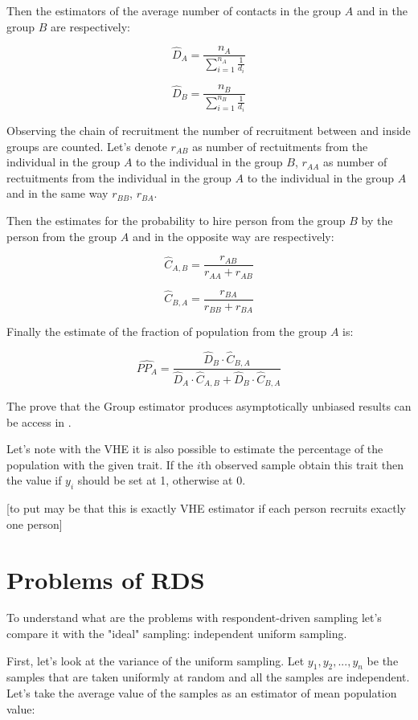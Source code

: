 \documentclass[12pt]{report}
\begin{document}
Then the estimators of the average number of contacts in the group $A$ and in the group $B$ are respectively:

$$ \widehat{D}_A = \frac{n_A}{ \sum_{i=1}^{n_A} \frac{1}{d_i}} $$

$$ \widehat{D}_B = \frac{n_B}{ \sum_{i=1}^{n_B} \frac{1}{d_i}} $$

Observing the chain of recruitment the number of recruitment between and inside groups are counted. Let's denote $r_{AB}$ as number of rectuitments from the individual in the group $A$ to the individual in the group $B$, $r_{AA}$ as number of rectuitments from the individual in the group $A$ to the individual in the group $A$ and in the same way $r_{BB}$, $r_{BA}$.

Then the estimates for the probability to hire person from the group $B$ by the person from the group $A$ and in the opposite way are respectively:


$$ \widehat{C}_{A, B} = \frac{r_{AB}}{r_{AA} + r_{AB}} $$

$$ \widehat{C}_{B, A} = \frac{r_{BA}}{r_{BB} + r_{BA}} $$

Finally the estimate of the fraction of population from the group $A$ is:

$$ \widehat{PP_A} = \frac{ \widehat{D}_B \cdot \widehat{C}_{B, A}}{ 
\widehat{D}_A \cdot \widehat{C}_{A, B} + \widehat{D}_B \cdot \widehat{C}_{B, A}} $$

The prove that the Group estimator produces asymptotically unbiased results can be access in \cite{salganik2004sampling}.

Let's note with the VHE it is also possible to estimate the percentage of the population with the given trait. If the $i$th observed sample obtain this trait then the value if $y_i$ should be set at 1, otherwise at 0.

[to put may be that this is exactly VHE estimator if each person recruits exactly one person]

\section{Problems of RDS}

To understand what are the problems with respondent-driven sampling let's compare it with the "ideal" sampling: independent uniform sampling.

First, let's look at the variance of the uniform sampling.
Let $y_1, y_2, ..., y_n$ be the samples that are taken uniformly at random and all the samples are independent. Let's take the average value of the samples as an estimator of mean population value:
\end{document}
